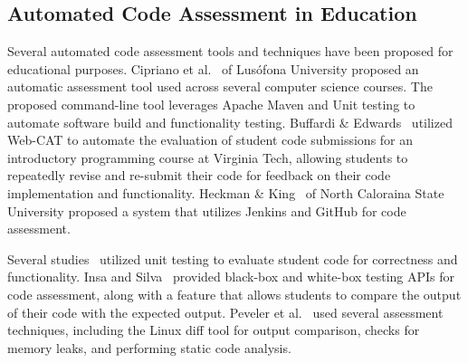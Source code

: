 \subsection{Automated Code Assessment in Education}
Several automated code assessment tools and techniques have been proposed for educational purposes. Cipriano et al.~\cite{cipriano2022drop} of Lusófona University proposed an automatic assessment tool used across several computer science courses. The proposed command-line tool leverages Apache Maven and Unit testing to automate software build and functionality testing. Buffardi \& Edwards~\cite{Buffardi2013} utilized Web-CAT to automate the evaluation of student code submissions for an introductory programming course at Virginia Tech, allowing students to repeatedly revise and re-submit their code for feedback on their code implementation and functionality. Heckman \& King~\cite{Heckman2018} of North Caloraina State University proposed a system that utilizes Jenkins and GitHub for code assessment.

Several studies~\cite{5557837,7883336,vander2013improving, peveler2017submitty} utilized unit testing to evaluate student code for correctness and functionality. Insa and Silva~\cite{INSA201859} provided black-box and white-box testing APIs for code assessment, along with a feature that allows students to compare the output of their code with the expected output. Peveler et al.~\cite{peveler2017submitty} used several assessment techniques, including the Linux diff tool for output comparison, checks for memory leaks, and performing static code analysis.